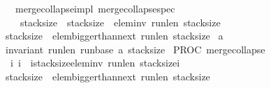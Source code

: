 \begin{isabellebody}
\ {\isacharparenleft}\ merge{\isacharunderscore}collapse{\isacharunderscore}impl{\isacharparenright}\ merge{\isacharunderscore}collapse{\isacharunderscore}spec{\isacharcolon}\isanewline
{\isachardoublequoteopen}{\isasymforall}{\isasymsigma}{\isachardot}\ {\isasymGamma}{\isasymturnstile}\ {\isasymlbrace}{\isasymsigma}{\isachardot}\ {\isacharparenleft}{\isasymacute}stack{\isacharunderscore}size{\isachargreater}{}{\isacharparenright}\ {\isasymand}\ {\isacharparenleft}{\isasymacute}stack{\isacharunderscore}size{\isasymge}{}\ {\isasymlongrightarrow}\ elem{\isacharunderscore}inv\ {\isasymacute}run{\isacharunderscore}len\ {\isacharparenleft}{\isasymacute}stack{\isacharunderscore}size{\isacharminus}{}{\isacharparenright}\ {}{}{\isacharparenright}\ {\isasymand}\isanewline
{\isacharparenleft}{\isasymacute}stack{\isacharunderscore}size{\isasymge}{}\ {\isasymlongrightarrow}\ elem{\isacharunderscore}bigger{\isacharunderscore}than{\isacharunderscore}next\ {\isasymacute}run{\isacharunderscore}len\ {\isacharparenleft}{\isasymacute}stack{\isacharunderscore}size{\isacharminus}{}{\isacharparenright}{\isacharparenright}\ {\isasymand}\isanewline
{\isacharparenleft}{\isasymacute}a\ {\isasymnoteq}\ {\isacharbrackleft}{\isacharbrackright}{\isacharparenright}\ {\isasymand}\isanewline
{\isacharparenleft}invariant\ {\isasymacute}run{\isacharunderscore}len\ {\isasymacute}run{\isacharunderscore}base\ {\isasymacute}a\ {\isasymacute}stack{\isacharunderscore}size{\isacharparenright}\ {\isasymrbrace}\isanewline
PROC\ merge{\isacharunderscore}collapse{\isacharparenleft}{\isacharparenright}\ \isanewline
{\isasymlbrace}\ {\isacharparenleft}{\isasymforall}i{\isachardot}\ {\isacharparenleft}{\isacharparenleft}i{\isasymge}{}\ {\isasymand}\ i{\isasymle}{\isasymacute}stack{\isacharunderscore}size{\isacharparenright}{\isasymlongrightarrow}{\isacharparenleft}elem{\isacharunderscore}inv\ {\isasymacute}run{\isacharunderscore}len\ {\isacharparenleft}{\isasymacute}stack{\isacharunderscore}size{\isacharminus}i{\isacharparenright}\ {}{}{\isacharparenright}{\isacharparenright}{\isacharparenright}\ {\isasymand}\isanewline
{\isacharparenleft}{\isasymacute}stack{\isacharunderscore}size{\isasymge}{}\ {\isasymlongrightarrow}\ elem{\isacharunderscore}bigger{\isacharunderscore}than{\isacharunderscore}next\ {\isasymacute}run{\isacharunderscore}len\ {\isacharparenleft}{\isasymacute}stack{\isacharunderscore}size{\isacharminus}{}{\isacharparenright}{\isacharparenright}\ {\isasymand}\isanewline

\end{isabellebody}
